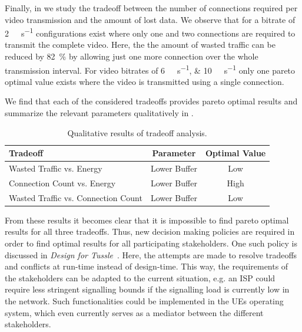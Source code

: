 Finally, in  we study the tradeoff between the number of connections required per video transmission and the amount of lost data.
We observe that for a bitrate of \SI{2}{\mega\bit\per\second} configurations exist where only one and two connections are required to transmit the complete video.
Here, the the amount of wasted traffic can be reduced by \SI{82}{\percent} by allowing just one more connection over the whole transmission interval.
For video bitrates of \SIlist{6;10}{\mega\bit\per\second} only one pareto optimal value exists where the video is transmitted using a single connection.

We find that each of the considered tradeoffs provides pareto optimal results and summarize the relevant parameters qualitatively in .
\begin{table}
  \centering
  \begin{tabular}{lcc}
    \toprule
    Tradeoff & Parameter & Optimal Value\\
    \midrule
    Wasted Traffic vs. Energy & Lower Buffer & Low\\
    Connection Count vs. Energy & Lower Buffer & High\\
    Wasted Traffic vs. Connection Count & Lower Buffer & Low\\
    \bottomrule
  \end{tabular}
  \caption{Qualitative results of tradeoff analysis.}
  \label{tab:application:lte_video:numerical_evaluation:trade_offs:summary}
\end{table}

From these results it becomes clear that it is impossible to find pareto optimal results for all three tradeoffs.
Thus, new decision making policies are required in order to find optimal results for all participating stakeholders.
One such policy is discussed in \emph{Design for Tussle}~\cite{trilogy2008,Clark2005}.
Here, the attempts are made to resolve tradeoffs and conflicts at run-time instead of design-time.
This way, the requirements of the stakeholders can be adapted to the current situation, e.g. an \gls{ISP} could require less stringent signalling bounds if the signalling load is currently low in the network.
Such functionalities could be implemented in the \glspl{UE} operating system, which even currently serves as a mediator between the different stakeholders.